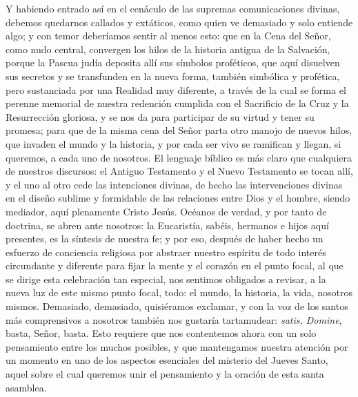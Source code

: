 
\begin{body}
Y habiendo entrado así en el cenáculo de las supremas comunicaciones divinas, debemos quedarnos callados y extáticos, como quien ve demasiado y solo entiende algo; y con temor deberíamos sentir al menos esto: que en la Cena del Señor, como nudo central, convergen los hilos de la historia antigua de la Salvación, porque la Pascua judía deposita allí sus símbolos proféticos, que aquí disuelven sus secretos y se transfunden en la nueva forma, también simbólica y profética, pero sustanciada por una Realidad muy diferente, a través de la cual se forma el perenne memorial de nuestra redención cumplida con el Sacrificio de la Cruz y la Resurrección gloriosa, y se nos da para participar de su virtud y tener su promesa; para que de la misma cena del Señor parta otro manojo de nuevos hilos, que invaden el mundo y la historia, y por cada ser vivo se ramifican y llegan, si queremos, a cada uno de nosotros. El lenguaje bíblico es más claro que cualquiera de nuestros discursos: el Antiguo Testamento y el Nuevo Testamento se tocan allí, y el uno al otro cede las intenciones divinas, de hecho las intervenciones divinas en el diseño sublime y formidable de las relaciones entre Dios y el hombre, siendo mediador, aquí plenamente Cristo Jesús. Océanos de verdad, y por tanto de doctrina, se abren ante nosotros: la Eucaristía, sabéis, hermanos e hijos aquí presentes, es la síntesis de nuestra fe; y por eso, después de haber hecho un esfuerzo de conciencia religiosa por abstraer nuestro espíritu de todo interés circundante y diferente para fijar la mente y el corazón en el punto focal, al que se dirige esta celebración tan especial, nos sentimos obligados a revisar, a la nueva luz de este mismo punto focal, todo: el mundo, la historia, la vida, nosotros mismos. Demasiado, demasiado, quisiéramos exclamar, y con la voz de los santos más comprensivos a nosotros también nos gustaría tartamudear: \textit{satis, Domine}, basta, Señor, basta. Esto requiere que nos contentemos ahora con un solo pensamiento entre los muchos posibles, y que mantengamos nuestra atención por un momento en uno de los aspectos esenciales del misterio del Jueves Santo, aquel sobre el cual queremos unir el pensamiento y la oración de esta santa asamblea. 
\end{body}


